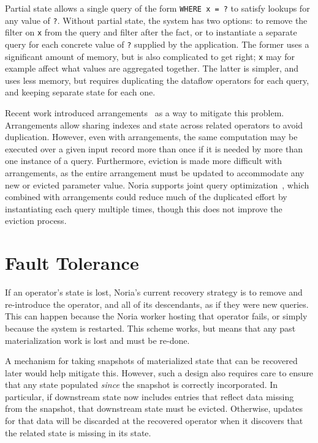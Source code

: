 Partial state allows a single query of the form \texttt{WHERE x = ?} to satisfy
lookups for any value of \texttt{?}. Without partial state, the system has two
options: to remove the filter on \texttt{x} from the query and filter after the
fact, or to instantiate a separate query for each concrete value of \texttt{?}
supplied by the application. The former uses a significant amount of memory, but
is also complicated to get right; \texttt{x} may for example affect what values
are aggregated together. The latter is simpler, and uses less memory, but
requires duplicating the dataflow operators for each query, and keeping separate
state for each one.

Recent work introduced arrangements~\cite{arrangements} as a way to mitigate
this problem. Arrangements allow sharing indexes and state across related
operators to avoid duplication. However, even with arrangements, the same
computation may be executed over a given input record more than once if it is
needed by more than one instance of a query. Furthermore, eviction is made more
difficult with arrangements, as the entire arrangement must be updated to
accommodate any new or evicted parameter value. Noria supports joint query
optimization~\cite{noria}, which combined with arrangements could reduce much of
the duplicated effort by instantiating each query multiple times, though this
does not improve the eviction process.

\section{Fault Tolerance}

If an operator's state is lost, Noria's current recovery strategy is to remove
and re-introduce the operator, and all of its descendants, as if they were new
queries. This can happen because the Noria worker hosting that operator fails,
or simply because the system is restarted. This scheme works, but means that any
past materialization work is lost and must be re-done.

A mechanism for taking snapshots of materialized state that can be recovered
later would help mitigate this. However, such a design also requires care to
ensure that any state populated \emph{since} the snapshot is correctly
incorporated. In particular, if downstream state now includes entries that
reflect data missing from the snapshot, that downstream state must be evicted.
Otherwise, updates for that data will be discarded at the recovered operator
when it discovers that the related state is missing in its state.


